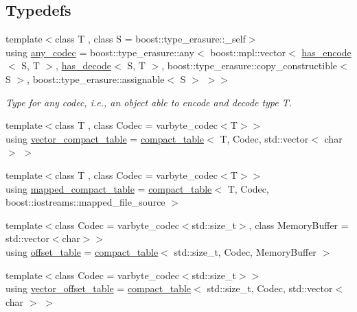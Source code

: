 \subsection*{Typedefs}
\begin{DoxyCompactItemize}
\item 
{\footnotesize template$<$class T , class S  = boost\+::type\+\_\+erasure\+::\+\_\+self$>$ }\\using \mbox{\hyperlink{namespaceirk_a831a3a869cf19601dbfb5c41765a2e87}{any\+\_\+codec}} = boost\+::type\+\_\+erasure\+::any$<$ boost\+::mpl\+::vector$<$ \mbox{\hyperlink{structirk_1_1has__encode}{has\+\_\+encode}}$<$ S, T $>$, \mbox{\hyperlink{structirk_1_1has__decode}{has\+\_\+decode}}$<$ S, T $>$, boost\+::type\+\_\+erasure\+::copy\+\_\+constructible$<$ S $>$, boost\+::type\+\_\+erasure\+::assignable$<$ S $>$ $>$$>$
\begin{DoxyCompactList}\small\item\em Type for any codec, i.\+e., an object able to encode and decode type {\ttfamily T}. \end{DoxyCompactList}\item 
{\footnotesize template$<$class T , class Codec  = varbyte\+\_\+codec$<$\+T$>$$>$ }\\using \mbox{\hyperlink{namespaceirk_a34b2e9b780a3b5d4532d7975d6c1a8bf}{vector\+\_\+compact\+\_\+table}} = \mbox{\hyperlink{classirk_1_1compact__table}{compact\+\_\+table}}$<$ T, Codec, std\+::vector$<$ char $>$ $>$
\item 
{\footnotesize template$<$class T , class Codec  = varbyte\+\_\+codec$<$\+T$>$$>$ }\\using \mbox{\hyperlink{namespaceirk_a355b82a658f8685da29eca82444fed3c}{mapped\+\_\+compact\+\_\+table}} = \mbox{\hyperlink{classirk_1_1compact__table}{compact\+\_\+table}}$<$ T, Codec, boost\+::iostreams\+::mapped\+\_\+file\+\_\+source $>$
\item 
{\footnotesize template$<$class Codec  = varbyte\+\_\+codec$<$std\+::size\+\_\+t$>$, class Memory\+Buffer  = std\+::vector$<$char$>$$>$ }\\using \mbox{\hyperlink{namespaceirk_a3d7b00f359d122e0bf0f709d21f00098}{offset\+\_\+table}} = \mbox{\hyperlink{classirk_1_1compact__table}{compact\+\_\+table}}$<$ std\+::size\+\_\+t, Codec, Memory\+Buffer $>$
\item 
{\footnotesize template$<$class Codec  = varbyte\+\_\+codec$<$std\+::size\+\_\+t$>$$>$ }\\using \mbox{\hyperlink{namespaceirk_a6d042444ebc87e3036291ec5656b0c51}{vector\+\_\+offset\+\_\+table}} = \mbox{\hyperlink{classirk_1_1compact__table}{compact\+\_\+table}}$<$ std\+::size\+\_\+t, Codec, std\+::vector$<$ char $>$ $>$
$$
\end{DoxyCompactItemize}
